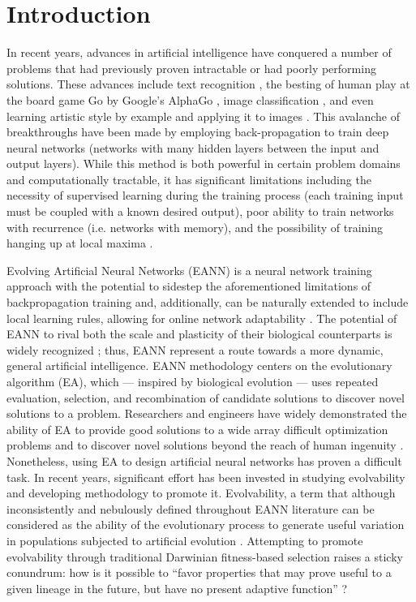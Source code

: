 \section{Introduction}
In recent years, advances in artificial intelligence have conquered a number of problems that had previously proven intractable or had poorly performing solutions. These advances include text recognition \autocite{GuRecentNetworks}, the besting of human play at the board game Go by Google's AlphaGo \autocite{Silver2016MasteringSearch}, image classification \autocite{GuRecentNetworks}, and even learning artistic style by example and applying it to images \autocite{Gatys2015AStyle}. This avalanche of breakthroughs have been made by employing back-propagation to train deep neural networks (networks with many hidden layers between the input and output layers). While this method is both powerful in certain problem domains and computationally tractable, it has significant limitations including the necessity of supervised learning during the training process (each training input must be coupled with a known desired output), poor ability to train networks with recurrence (i.e. networks with memory), and the possibility of training hanging up at local maxima \autocite[pg 312, 364]{Downing2015IntelligenceSystems}. 

Evolving Artificial Neural Networks (EANN) is a neural network training approach with the potential to sidestep the aforementioned limitations of backpropagation training and, additionally, can be naturally extended to include local learning rules, allowing for online network adaptability \autocite{Tonelli2013OnNetworks}. The potential of EANN to rival both the scale and plasticity of their biological counterparts is widely recognized \autocite{Tonelli2013OnNetworks}; thus, EANN represent a route towards a more dynamic, general artificial intelligence. EANN methodology centers on the evolutionary algorithm (EA), which --- inspired by biological evolution --- uses repeated evaluation, selection, and recombination of candidate solutions to discover novel solutions to a problem. Researchers and engineers have widely demonstrated the ability of EA to provide good solutions to a wide array difficult optimization problems and to discover novel solutions beyond the reach of human ingenuity \autocite{Poli2008AProgramming}. Nonetheless, using EA to design artificial neural networks has proven a difficult task. In recent years, significant effort has been invested in studying evolvability and developing methodology to promote it. Evolvability, a term that although inconsistently and nebulously defined throughout EANN literature \autocite{Richter2015EvolvabilitySurvey} can be considered as the ability of the evolutionary process to generate useful variation in populations subjected to artificial evolution \autocite{Richter2015EvolvabilitySurvey,Reisinger2005TowardsEvolvability, Wilder2015ReconcilingEvolvability}. Attempting to promote evolvability through traditional Darwinian fitness-based selection raises a sticky conundrum: how is it possible to ``favor properties that may prove useful to a given lineage in the future, but have no present adaptive function'' \autocite{Pigliucci2008IsEvolvable}? 

